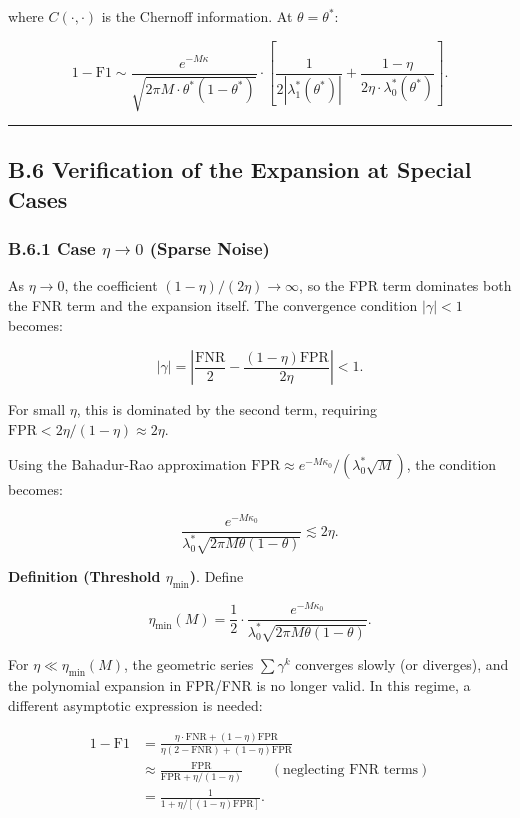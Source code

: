 \documentclass[
  12pt,
]{article}
\begin{document}
where \(C(\cdot,\cdot)\) is the Chernoff information. At
\(\theta = \theta^*\):

\[1 - \text{F1} \sim \frac{e^{-M\kappa}}{\sqrt{2\pi M \cdot \theta^*(1-\theta^*)}} \cdot
\left[\frac{1}{2|\lambda_1^*(\theta^*)|} + \frac{1-\eta}{2\eta \cdot \lambda_0^*(\theta^*)}\right].\]

\begin{center}\rule{0.5\linewidth}{0.5pt}\end{center}

\subsection{B.6 Verification of the Expansion at Special
Cases}\label{b.6-verification-of-the-expansion-at-special-cases}

\subsubsection{\texorpdfstring{B.6.1 Case \(\eta \to 0\) (Sparse
Noise)}{B.6.1 Case \textbackslash eta \textbackslash to 0 (Sparse Noise)}}\label{b.6.1-case-eta-to-0-sparse-noise}

As \(\eta \to 0\), the coefficient \((1-\eta)/(2\eta) \to \infty\), so
the FPR term dominates both the FNR term and the expansion itself. The
convergence condition \(|\gamma| < 1\) becomes:

\[|\gamma| = \left|\frac{\text{FNR}}{2} - \frac{(1-\eta)\text{FPR}}{2\eta}\right| < 1.\]

For small \(\eta\), this is dominated by the second term, requiring
\(\text{FPR} < 2\eta/(1-\eta) \approx 2\eta\).

Using the Bahadur-Rao approximation
\(\text{FPR} \approx e^{-M\kappa_0}/(\lambda_0^*\sqrt{M})\), the
condition becomes:

\[\frac{e^{-M\kappa_0}}{\lambda_0^*\sqrt{2\pi M \theta(1-\theta)}} \lesssim 2\eta.\]

\textbf{Definition (Threshold \(\eta_{\min}\))}. Define

\[\eta_{\min}(M) = \frac{1}{2} \cdot \frac{e^{-M\kappa_0}}{\lambda_0^*\sqrt{2\pi M \theta(1-\theta)}}.\]

For \(\eta \ll \eta_{\min}(M)\), the geometric series \(\sum \gamma^k\)
converges slowly (or diverges), and the polynomial expansion in FPR/FNR
is no longer valid. In this regime, a different asymptotic expression is
needed:

\[\begin{aligned}
1 - \text{F1} &= \frac{\eta\cdot\text{FNR} + (1-\eta)\text{FPR}}
{\eta(2-\text{FNR}) + (1-\eta)\text{FPR}} \\
&\approx \frac{\text{FPR}}{\text{FPR} + \eta/(1-\eta)} \qquad (\text{neglecting FNR terms}) \\
&= \frac{1}{1 + \eta/[(1-\eta)\text{FPR}]}.
\end{aligned}\]
\end{document}
